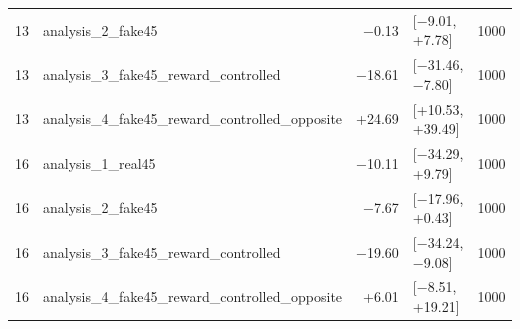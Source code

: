 \begin{table}[htbp]
\begin{tabular}{rlrlr}
    13 & analysis\_2\_fake45 & −0.13 & [−9.01, +7.78] & 1000 \\
    13 & analysis\_3\_fake45\_reward\_controlled & −18.61 & [−31.46, −7.80] & 1000 \\
    13 & analysis\_4\_fake45\_reward\_controlled\_opposite & +24.69 & [+10.53, +39.49] & 1000 \\
    16 & analysis\_1\_real45 & −10.11 & [−34.29, +9.79] & 1000 \\
    16 & analysis\_2\_fake45 & −7.67 & [−17.96, +0.43] & 1000 \\
    16 & analysis\_3\_fake45\_reward\_controlled & −19.60 & [−34.24, −9.08] & 1000 \\
    16 & analysis\_4\_fake45\_reward\_controlled\_opposite & +6.01 & [−8.51, +19.21] & 1000 \\
    \bottomrule
  \end{tabular}
\end{table}

